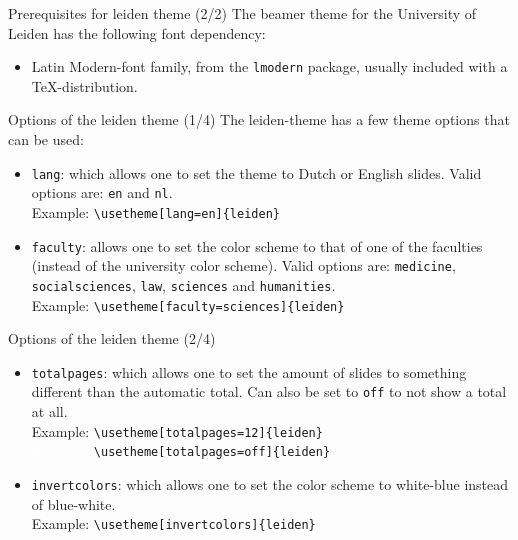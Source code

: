 \documentclass[t,11pt]{beamer}
\begin{document}
\begin{frame}[fragile]{Prerequisites for leiden theme (2/2)}
\small
The beamer theme for the University of Leiden has the following
font dependency:
\begin{itemize}
\item	Latin Modern-font family, from the \texttt{lmodern}
		package, usually included with a \TeX-distribution.
\end{itemize}
\end{frame}

\begin{frame}[fragile]{Options of the leiden theme (1/4)}
The leiden-theme has a few theme options that can be used:

\begin{itemize}
\item	\alert{\texttt{lang}}: which allows one to set the theme
		to Dutch or English slides.
		Valid options are: \verb|en| and \verb|nl|.\\
\vspace{0.1\baselineskip}
		Example: \verb|\usetheme[lang=en]{leiden}|
\vspace{0.5\baselineskip}
\item	\alert{\texttt{faculty}}: allows one to set the color
		scheme to that of one of the faculties (instead of the
		university color scheme).
		Valid options are: \verb|medicine|, \verb|socialsciences|,
		\verb|law|, \verb|sciences| and \verb|humanities|.\\
\vspace{0.1\baselineskip}
		Example: \verb|\usetheme[faculty=sciences]{leiden}|
\end{itemize}
\end{frame}

\begin{frame}[fragile]{Options of the leiden theme (2/4)}
\begin{itemize}
\item	\alert{\texttt{totalpages}}: which allows one to set the
		amount of slides to something different than the
		automatic total. Can also be set to \texttt{off} to not show
		a total at all.\\
\vspace{0.1\baselineskip}
		Example: \verb|\usetheme[totalpages=12]{leiden}|\\
		\textcolor{white}{Example:} \verb|\usetheme[totalpages=off]{leiden}|
\vspace{0.5\baselineskip}
\item	\alert{\texttt{invertcolors}}: which allows one to set the color
		scheme to white-blue instead of blue-white.\\
\vspace{0.1\baselineskip}
		Example: \verb|\usetheme[invertcolors]{leiden}|
\end{itemize}
\end{frame}
\end{document}
